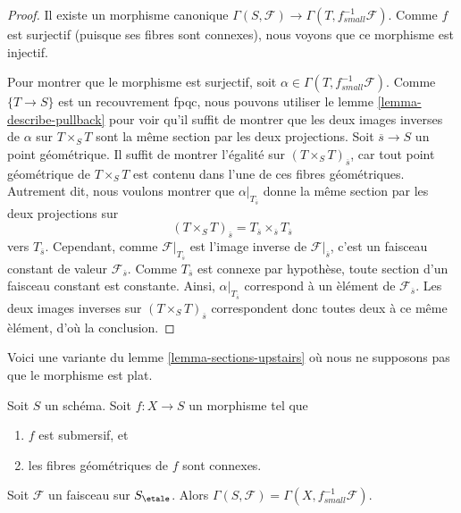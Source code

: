 \begin{proof}
Il existe un morphisme canonique
$\Gamma(S, \mathcal{F}) \to \Gamma(T, f_{small}^{-1}\mathcal{F})$.
Comme $f$ est surjectif (puisque ses fibres sont connexes), nous voyons que
ce morphisme est injectif.

\medskip\noindent
Pour montrer que le morphisme est surjectif, soit
$\alpha \in \Gamma(T, f_{small}^{-1}\mathcal{F})$.
Comme $\{T \to S\}$ est un recouvrement fpqc, nous pouvons utiliser le
lemme \ref{lemma-describe-pullback} pour voir qu'il suffit de montrer que
les deux images inverses de $\alpha$ sur $T \times_S T$ sont la m\^eme section
par les deux projections. Soit $\overline{s} \to S$ un point g\'eom\'etrique.
Il suffit de montrer l'\'egalit\'e sur $(T \times_S T)_{\overline{s}}$,
car tout point g\'eom\'etrique de $T \times_S T$ est contenu dans l'une de
ces fibres g\'eom\'etriques. Autrement dit, nous voulons montrer que
$\alpha|_{T_{\overline{s}}}$ donne la m\^eme section par les deux projections sur
$$
(T \times_S T)_{\overline{s}} =
T_{\overline{s}} \times_{\overline{s}} T_{\overline{s}}
$$
vers $T_{\overline{s}}$.
Cependant, comme $\mathcal{F}|_{T_{\overline{s}}}$ est l'image
inverse de $\mathcal{F}|_{\overline{s}}$, c'est un faisceau constant
de valeur $\mathcal{F}_{\overline{s}}$. Comme $T_{\overline{s}}$
est connexe par hypoth\`ese, toute section d'un faisceau constant est constante.
Ainsi, $\alpha|_{T_{\overline{s}}}$ correspond \`a un \`el\'ement
de $\mathcal{F}_{\overline{s}}$. Les deux images inverses sur
$(T \times_S T)_{\overline{s}}$ correspondent donc toutes deux
\`a ce m\^eme \`el\'ement, d'o\`u la conclusion.
\end{proof}

\noindent
Voici une variante du lemme \ref{lemma-sections-upstairs}
o\`u nous ne supposons pas que le morphisme est plat.

\begin{lemma}
\label{lemma-sections-upstairs-submersive}
Soit $S$ un sch\'ema. Soit $f : X \to S$ un morphisme tel que
\begin{enumerate}
\item $f$ est submersif, et
\item les fibres g\'eom\'etriques de $f$ sont connexes.
\end{enumerate}
Soit $\mathcal{F}$ un faisceau sur $S_\etale$.
Alors $\Gamma(S, \mathcal{F}) = \Gamma(X, f^{-1}_{small}\mathcal{F})$.
\end{lemma}

